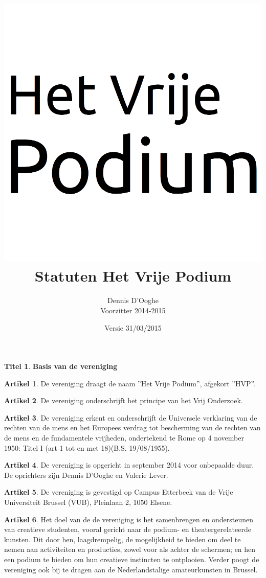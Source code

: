 \documentclass[a4paper,10pt]{article}
\title{\vspace{-2.0cm}\includegraphics[scale=0.3]{img/logo.png}\\
  \vspace{1cm}Statuten Het Vrije Podium}
\author{Dennis D'Ooghe\\Voorzitter 2014-2015}
\date{Versie 31/03/2015} %
\theoremstyle{definition}
\newtheorem{titel}{\newline\Large Titel}
\newtheorem{artikel}{\large Artikel}
\newcommand{\ttext}[1]{\Large \textbf{#1} \normalsize}
\newcommand{\ttextcr}{\hfill\newline}
\begin{document}
\maketitle

\begin{versionhistory}
\end{versionhistory}

\newpage


\begin{titel}\ttext{Basis van de vereniging}

  \begin{artikel}\ttextcr
    De vereniging draagt de naam ''Het Vrije Podium'', afgekort ''HVP''.
  \end{artikel}

  \begin{artikel}\ttextcr
    De vereniging onderschrijft het principe van het Vrij Onderzoek.
  \end{artikel}

  \begin{artikel}\ttextcr
    De vereniging erkent en onderschrijft de Universele verklaring van de rechten van de mens en het Europees verdrag tot bescherming van de rechten van de mens en de fundamentele vrijheden, ondertekend te Rome op 4 november 1950: Titel I (art 1 tot en met 18)(B.S. 19/08/1955).
  \end{artikel}

  \begin{artikel}\label{kring-oprichting}\ttextcr
    De vereniging is opgericht in september 2014 voor onbepaalde duur.
    De oprichters zijn Dennis D'Ooghe en Valerie Lever.
  \end{artikel}

  \begin{artikel}\ttextcr
    De vereniging is gevestigd op Campus Etterbeek van de Vrije Universiteit Brussel (VUB), Pleinlaan 2, 1050 Elsene.
  \end{artikel}

  \begin{artikel}\ttextcr
    Het doel van de de vereniging is het samenbrengen en ondersteunen van creatieve studenten, vooral gericht naar de podium- en theatergerelateerde kunsten.
    Dit door hen, laagdrempelig, de mogelijkheid te bieden om deel te nemen aan activiteiten en producties, zowel voor als achter de schermen; en hen een podium te bieden om hun creatieve instincten te ontplooien.
    Verder poogt de vereniging ook bij te dragen aan de Nederlandstalige amateurkunsten in Brussel.
  \end{artikel}


\end{titel}
\end{document}
